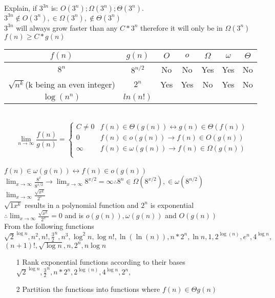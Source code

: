 \documentclass[12pt,largemargins]{homework}
\begin{document}
\question
Explain, if $3^{3 n}$ is: $ O ( 3^n ) ; \Omega ( 3^n ) ; \Theta ( 3^n ).$\\
$3^{3n} \notin O(3^n), \in \Omega(3^n), \notin \Theta(3^n)$\\
$3^{3n}$ will always grow faster than any $C * 3^n$ therefore it will only be in $\Omega(3^n)$ $f(n)\geq C*g(n)$\\
\question
\begin{tabular}{|c|c|c|c|c|c|c|}
\hline
$f(n)$&$g(n)$&$O$&$o$&$\Omega$&$\omega$&$\Theta$\\
\hline
$8^n$&$8^{n/2}$&No&No&Yes&Yes&No\\
\hline
$\sqrt{n^k} $(k being an even integer)$ $&$2^n$&Yes& Yes&No&Yes&No\\
\hline
$\log(n^n)$&$ln(n!)$\\
\hline
\end{tabular}\\
$$\lim_{n\to\infty}\frac{f(n)}{g(n)}=
\begin{cases} 
      C \neq 0 & f(n) \in \Theta(g(n)) \leftrightarrow g(n) \in \Theta(f(n))\\
      0 & f(n) \in o(g(n)) \rightarrow f(n) \in O(g(n))\\
      \infty & f(n) \in \omega(g(n)) \rightarrow f(n) \in \Omega(g(n))\\
   \end{cases}
\,$$\\
$f(n) \in \omega(g(n)) \leftrightarrow f(n) \in o(g(n))$\\
$\lim_{x\to\infty}\frac{8^x}{8^{x/2}}\rightarrow\lim_{x\to\infty}8^{x/2}=\infty\therefore 8^n \in \Omega (8^{x/2}), \in \omega(8^{n/2})$\\
$\lim_{x\to\infty} \frac{\sqrt{x^k}}{2^x}$\\
$\sqrt{1x^k}$ results in a polynomial function and $2^n$ is exponential\\
$\therefore \lim_{x\to\infty} \frac{\sqrt{x^k}}{2^x} = 0$ and is $o(g(n)), \omega (g(n))$ and $O(g(n))$\\
\question
From the following functions \\$ \sqrt{2}^{\log n},n^2,n!,\frac{3}{2}^n,n^3,\log^2 n, \log n!, \ln(\ln(n)), n*2^n, \ln n, 1,2^{\log(n)}, e^n, 4^{\log n},$ \\ $ (n+1)!, \sqrt{\log n}, n, 2^n,  n \log n$\\
\begin{itemize}
	\item[1] 
	Rank exponential functions according to their bases\\
	$  \sqrt{2}^{\log n}, \frac{3}{2}^n,  n*2^n,2^{\log(n)}, 4^{\log n}, 2^n,$
	\item[2]
	Partition the functions into functions where $ f(n)\in \Theta g(n) $\\
\end{itemize}
\end{document}
